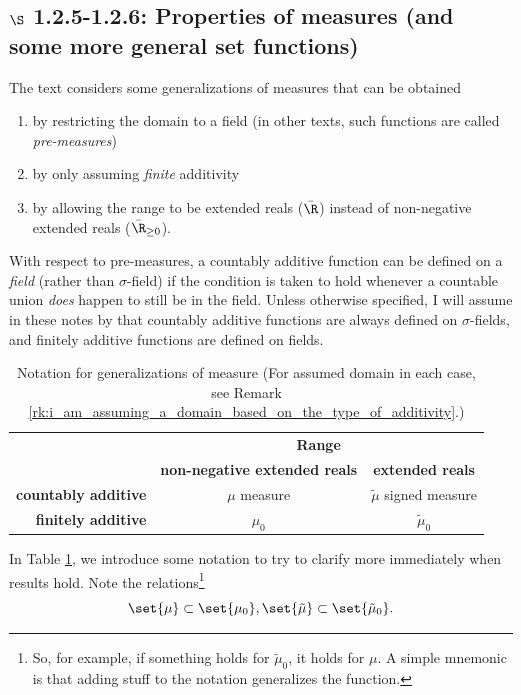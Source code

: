 \documentclass{article} %
\renewcommand{\sf}{$\sigma$-field}
\newcommand{\sfs}{$\sigma$-fields}
\begin{document}
\subsection{$\S$ 1.2.5-1.2.6: Properties of measures (and some more general set functions)}

The text considers some generalizations of measures that can be obtained
\begin{enumerate}
\item  by restricting the domain to a field {\footnotesize (in other texts, such functions are called \textit{pre-measures}) }
\item  by only assuming \textit{finite} additivity 
\item by allowing the range to be extended reals ($\bar{\R}$) instead of non-negative extended reals ($\bar{\R}_{\geq 0}$).  
\end{enumerate}



\begin{remark}
With respect to pre-measures, a countably additive function can be defined on a \textit{field} (rather than \sf) if the condition is taken to hold whenever a countable union \textit{does} happen to still be in the field.  Unless otherwise specified, I will assume in these notes by that countably additive functions are always defined on \sfs, and finitely additive functions are defined on fields.
\label{rk:i_am_assuming_a_domain_based_on_the_type_of_additivity}
\end{remark}	



\begin{table}[!h]
\centering	
\begin{tabular}{rcc}
&\multicolumn{2}{c}{\textbf{Range}} \\
& \textbf{non-negative extended reals} & \textbf{extended reals} \\
\textbf{countably additive}& $\mu$ measure  & $\tilde{\mu}$ signed measure \\
\textbf{finitely additive}& $\mu_0$ & $\tilde{\mu}_0$ \\	
\end{tabular}
\caption{Notation for generalizations of measure (For assumed domain in each case, see Remark \ref{rk:i_am_assuming_a_domain_based_on_the_type_of_additivity}.)}
\label{tab:notation_for_generalizations_of_measure}
\end{table}

In Table \ref{tab:notation_for_generalizations_of_measure},  we introduce some notation to try to clarify more immediately when results hold. Note the relations\footnote{So, for example, if something holds for $\tilde{\mu}_0$, it holds for $\mu$.  A simple mnemonic is that adding stuff to the notation generalizes the function.}  
\[ \set{\mu} \subset \set{\mu_0}, \set{\tilde{\mu}} \subset \set{\tilde{\mu}_0}. \]
\end{document}
